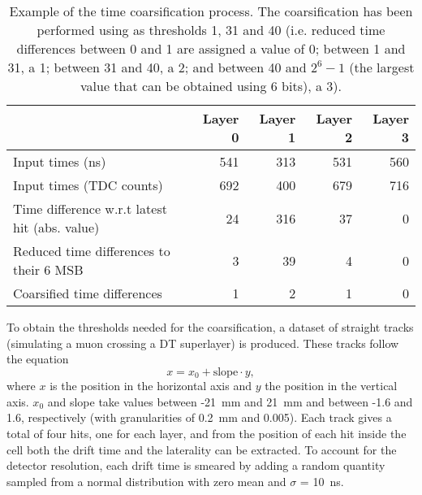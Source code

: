 \documentclass[../main.tex]{subfiles}
\begin{document}
\begin{table}[h!]
\begin{center}
\begin{small}
\begin{tabular}{l || r | r | r | r}
                                                & Layer 0 & Layer 1 & Layer 2 & Layer 3 \\\hline\hline
Input times (ns)                                & 541     & 313     & 531     & 560     \\\hline
Input times (TDC counts)                        & 692     & 400     & 679     & 716     \\\hline
Time difference w.r.t latest hit (abs. value)   & 24      & 316     & 37      & 0       \\\hline
Reduced time differences to their 6 MSB         & 3       & 39      & 4       & 0       \\\hline
Coarsified time differences                     & 1       & 2       & 1       & 0
\end{tabular}
\end{small}
\caption{Example of the time coarsification process. The coarsification has been performed using as thresholds 1, 31 and 40 (i.e. reduced time differences between 0 and 1 are assigned a value of 0; between 1 and 31, a 1; between 31 and 40, a 2; and between 40 and $2^6 - 1$ (the largest value that can be obtained using 6 bits), a 3).}
\label{dts:tab:coarsification_example}
\end{center}

\end{table}

To obtain the thresholds needed for the coarsification, a dataset of straight tracks (simulating a muon crossing a DT superlayer) is produced. These tracks follow the equation
\begin{equation}
x = x_0 + \text{slope} \cdot y,
\end{equation}
where $x$ is the position in the horizontal axis and $y$ the position in the vertical axis. $x_0$ and slope take values between -21~mm and 21~mm and between -1.6 and 1.6, respectively (with granularities of 0.2~mm and 0.005). Each track gives a total of four hits, one for each layer, and from the position of each hit inside the cell both the drift time and the laterality can be extracted. To account for the detector resolution, each drift time is smeared by adding a random quantity sampled from a normal distribution with zero mean and $\sigma$ = 10~ns. 
\end{document}
